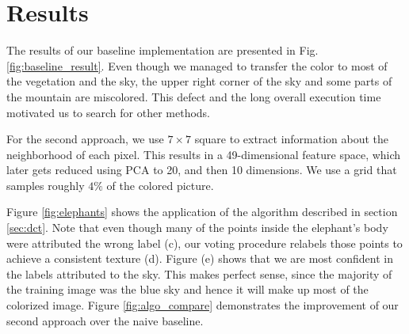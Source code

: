 \section{Results}
\label{sec:results}

The results of our baseline implementation are presented in Fig. \ref{fig:baseline_result}. Even though we managed to transfer the color to most of the vegetation and the sky, the upper right corner of the sky and some parts of the mountain are miscolored. This defect and the long overall execution time motivated us to search for other methods. 

For the second approach, we use $7\times7$ square to extract information about the neighborhood of each pixel. This results in a 49-dimensional feature space, which later gets reduced using PCA to 20, and then 10 dimensions. We use a grid that samples roughly $4\%$ of the colored picture. 

Figure \ref{fig:elephants} shows the application of the algorithm described in section \ref{sec:dct}. Note that even though many of the points inside the elephant's body were attributed the wrong label (c), our voting procedure relabels those points to achieve a consistent texture (d). Figure (e) shows that we are most confident in the labels attributed to the sky. This makes perfect sense, since the majority of the training image was the blue sky and hence it will make up most of the colorized image. Figure \ref{fig:algo_compare} demonstrates the improvement of our second approach over the naive baseline. 